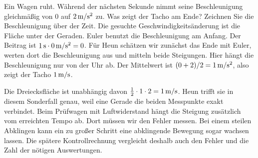 Ein Wagen ruht. Während der nächsten Sekunde nimmt seine Beschleunigung gleichmäßig von 0 auf \(2\,\mathrm{m/s^2}\) zu. Was zeigt der Tacho am Ende? Zeichnen Sie die Beschleunigung über der Zeit. Die gesuchte Geschwindigkeitsänderung ist die Fläche unter der Geraden.
Euler benutzt die Beschleunigung am Anfang. Der Beitrag ist \(1\,\mathrm{s}\cdot0\,\mathrm{m/s^2}=0\). Für Heun schätzen wir zunächst das Ende mit Euler, werten dort die Beschleunigung aus und mitteln beide Steigungen. Hier hängt die Beschleunigung nur von der Uhr ab. Der Mittelwert ist \((0+2)/2=1\,\mathrm{m/s^2}\), also zeigt der Tacho \(1\,\mathrm{m/s}\).

Die Dreiecksfläche ist unabhängig davon \(\tfrac12\cdot1\cdot2=1\,\mathrm{m/s}\). Heun trifft sie in diesem Sonderfall genau, weil eine Gerade die beiden Messpunkte exakt verbindet. Beim Prüfwagen mit Luftwiderstand hängt die Steigung zusätzlich vom erreichten Tempo ab. Dort müssen wir den Fehler messen.
Bei einem steilen Abklingen kann ein zu großer Schritt eine abklingende Bewegung sogar wachsen lassen. Die spätere Kontrollrechnung vergleicht deshalb auch den Fehler und die Zahl der nötigen Auswertungen.


